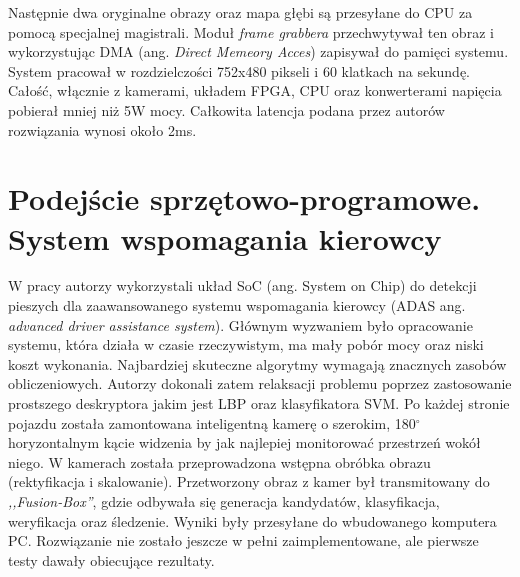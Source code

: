 Następnie dwa oryginalne obrazy oraz mapa głębi są przesyłane do CPU za pomocą specjalnej magistrali.
Moduł \textit{frame grabbera} przechwytywał ten obraz i wykorzystując DMA (ang. \textit{Direct Memeory Acces}) zapisywał do pamięci systemu.
System pracował w rozdzielczości 752x480 pikseli i 60 klatkach na sekundę. 
Całość, włącznie z kamerami, układem FPGA, CPU oraz konwerterami napięcia pobierał mniej niż 5W mocy. 
Całkowita latencja podana przez autorów rozwiązania wynosi około 2ms.


\section{Podejście sprzętowo-programowe. System wspomagania kierowcy}
W pracy \cite{piao2016real} autorzy wykorzystali układ SoC (ang. System on Chip) do detekcji pieszych dla zaawansowanego systemu wspomagania kierowcy (ADAS ang. \textit{advanced driver assistance system}). 
Głównym wyzwaniem było opracowanie systemu, która działa w czasie rzeczywistym, ma mały pobór mocy oraz niski koszt wykonania. 
Najbardziej skuteczne algorytmy wymagają znacznych zasobów obliczeniowych. %
Autorzy dokonali zatem relaksacji problemu poprzez zastosowanie prostszego deskryptora jakim jest LBP oraz klasyfikatora SVM. 
Po każdej stronie pojazdu została zamontowana inteligentną kamerę o szerokim, 180$^\circ$ horyzontalnym kącie widzenia by jak najlepiej monitorować przestrzeń wokół niego. 
W kamerach została przeprowadzona wstępna obróbka obrazu (rektyfikacja i skalowanie). 
Przetworzony obraz z kamer był transmitowany do \textit{,,Fusion-Box''}, gdzie odbywała się generacja kandydatów, klasyfikacja, weryfikacja oraz śledzenie. 
Wyniki były przesyłane do wbudowanego komputera PC. 
Rozwiązanie nie zostało jeszcze w pełni zaimplementowane, ale pierwsze testy dawały obiecujące rezultaty.


